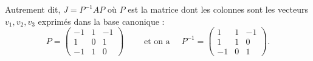 \documentclass[12pt, class=report,crop=false]{standalone}
\begin{document}
\begin{exemple}
\begin{enumerate}
  Autrement dit, $J = P^{-1}AP$ où $P$ est la matrice dont les colonnes sont les vecteurs $v_1, v_2, v_3$ exprimés dans la base canonique :
$$P =  \begin{pmatrix}
-1 & 1 & -1 \\
1 & 0 & 1 \\
-1 & 1 & 0
\end{pmatrix} \qquad 
\text{ et on a } \quad
P^{-1} = \begin{pmatrix}
1 & 1 & -1 \\
1 & 1 & 0 \\
-1 & 0 & 1
\end{pmatrix}.
$$
%
%  
%
%
%


\end{enumerate}
\end{exemple}
\end{document}
